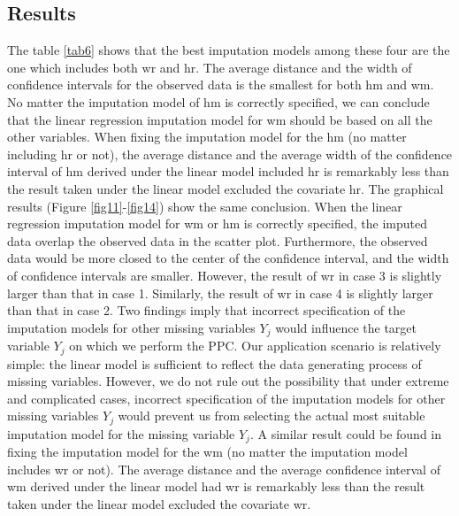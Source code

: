 \documentclass[12pt, fullpage, a4paper]{article}
\begin{document}
\subsection{Results}
The table \ref{tab6} shows that the best imputation models among these four are the one which includes both wr and hr. The average distance and the width of confidence intervals for the observed data is the smallest for both hm and wm. No matter the imputation model of hm is correctly specified, we can conclude that the linear regression imputation model for wm should be based on all the other variables. When fixing the imputation model for the hm (no matter including hr or not), the average distance and the average width of the confidence interval of hm derived under the linear model included hr is remarkably less than the result taken under the linear model excluded the covariate hr. The graphical results (Figure \ref{fig11}-\ref{fig14}) show the same conclusion. When the linear regression imputation model for wm or hm is correctly specified, the imputed data overlap the observed data in the scatter plot. Furthermore, the observed data would be more closed to the center of the confidence interval, and the width of confidence intervals are smaller. However, the result of wr in case 3 is slightly larger than that in case 1. Similarly, the result of wr in case 4 is slightly larger than that in case 2. Two findings imply that incorrect specification of the imputation models for other missing variables $Y_j$ would influence the target variable $Y_j$ on which we perform the PPC. Our application scenario is relatively simple: the linear model is sufficient to reflect the data generating process of missing variables. However, we do not rule out the possibility that under extreme and complicated cases, incorrect specification of the imputation models for other missing variables $Y_j$ would prevent us from selecting the actual most suitable imputation model for the missing variable $Y_j$. A similar result could be found in fixing the imputation model for the wm (no matter the imputation model includes wr or not). The average distance and the average confidence interval of wm derived under the linear model had wr is remarkably less than the result taken under the linear model excluded the covariate wr.
\end{document}
